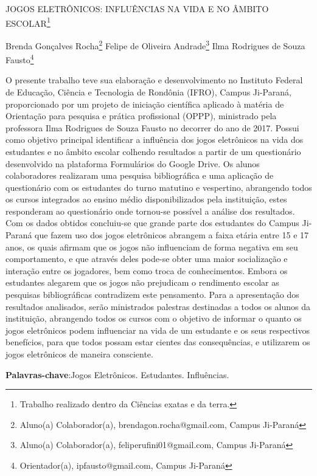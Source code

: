 \documentclass[article,12pt,onesidea,4paper,english,brazil]{abntex2}
\begin{document}
	
	
	\frenchspacing 
	
	\begin{center}
		\LARGE JOGOS ELETRÔNICOS: INFLUÊNCIAS NA VIDA E NO ÂMBITO ESCOLAR\footnote{Trabalho realizado dentro da Ciências exatas e da terra.}
		
		\normalsize
		Brenda Gonçalves Rocha\footnote{Aluno(a) Colaborador(a), brendagon.rocha@gmail.com, Campus Ji-Paraná} 
		Felipe de Oliveira Andrade\footnote{Aluno(a) Colaborador(a), feliperufini01@gmail.com, Campus Ji-Paraná} 
	    Ilma Rodrigues de Souza Fausto\footnote{Orientador(a), ipfausto@gmail.com, Campus Ji-Paraná} 
		 
	\end{center}
	
	\noindent O presente trabalho teve sua elaboração e desenvolvimento no Instituto Federal de
	Educação, Ciência e Tecnologia de Rondônia (IFRO), Campus Ji-Paraná,
	proporcionado por um projeto de iniciação científica aplicado à matéria de Orientação
	para pesquisa e prática profissional (OPPP), ministrado pela professora Ilma
	Rodrigues de Souza Fausto no decorrer do ano de 2017. Possui como objetivo
	principal identificar a influência dos jogos eletrônicos na vida dos estudantes e no
	âmbito escolar colhendo resultados a partir de um questionário desenvolvido na
	plataforma Formulários do Google Drive. Os alunos colaboradores realizaram uma
	pesquisa bibliográfica e uma aplicação de questionário com os estudantes do turno
	matutino e vespertino, abrangendo todos os cursos integrados ao ensino médio
	disponibilizados pela instituição, estes responderam ao questionário onde tornou-se
	possível a análise dos resultados. Com os dados obtidos concluiu-se que grande parte
	dos estudantes do Campus Ji-Paraná que fazem uso dos jogos eletrônicos abrangem
	a faixa etária entre 15 e 17 anos, os quais afirmam que os jogos não influenciam de
	forma negativa em seu comportamento, e que através deles pode-se obter uma maior
	socialização e interação entre os jogadores, bem como troca de conhecimentos.
	Embora os estudantes alegarem que os jogos não prejudicam o rendimento escolar
	as pesquisas bibliográficas contradizem este pensamento. Para a apresentação dos
	resultados analisados, serão ministrados palestras destinadas a todos os alunos da
	instituição, abrangendo todos os cursos com o objetivo de informar o quanto os jogos
	eletrônicos podem influenciar na vida de um estudante e os seus respectivos
	benefícios, para que todos possam estar cientes das consequências, e utilizarem os
	jogos eletrônicos de maneira consciente.
	
	\vspace{\onelineskip}
	
	\noindent
	\textbf{Palavras-chave}:Jogos Eletrônicos. Estudantes. Influências.
	
\end{document}
